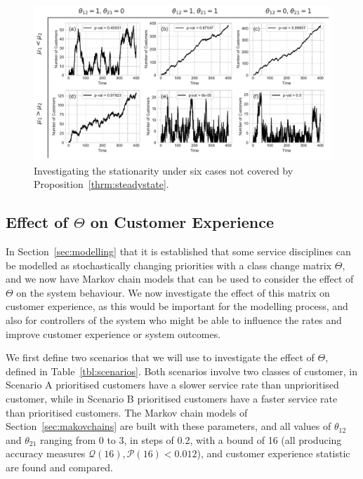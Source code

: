 \documentclass{article}
\begin{document}
\begin{figure}
  \begin{center}
    \includegraphics[width=\textwidth]{img/adf_theorem_gap.pdf}
    \caption{Investigating the stationarity under six cases not covered by
    Proposition~\ref{thrm:steadystate}.}
    \label{fig:adf_gap}
  \end{center}
\end{figure}



\subsection{Effect of $\Theta$ on Customer Experience}\label{sec:behaviour}
In Section~\ref{sec:modelling} that it is established that some service
disciplines can be modelled as stochastically changing priorities with a class
change matrix $\Theta$, and we now have Markov chain models that can be used to
consider the effect of $\Theta$ on the system behaviour. We now investigate the
effect of this matrix on customer experience, as this would be important for the
modelling process, and also for controllers of the system who might be able to
influence the rates and improve customer experience or system outcomes.

We first define two scenarios that we will use to investigate the effect of
$\Theta$, defined in Table~\ref{tbl:scenarios}. Both scenarios involve two
classes of customer, in Scenario A prioritised customers have a slower service
rate than unprioritised customer, while in Scenario B prioritised customers have
a faster service rate than prioritised customers. The Markov chain models of
Section~\ref{sec:makovchains} are built with these parameters, and all values
of $\theta_{12}$ and $\theta_{21}$ ranging from 0 to 3, in steps of 0.2, with a
bound of 16 (all producing accuracy measures
$\mathcal{Q}(16), \mathcal{P}(16) < 0.012$),
and customer experience statistic are found and compared.
\end{document}
